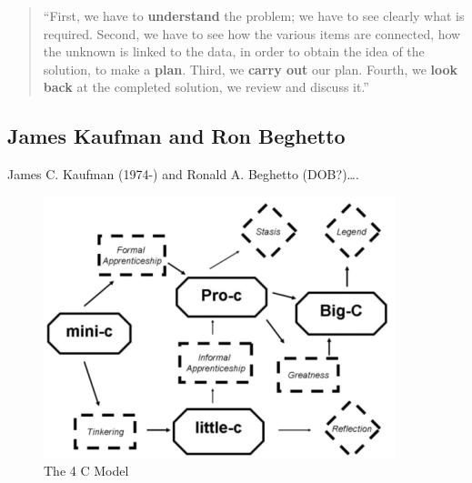 \begin{quote}
  ``First, we have to \textbf{understand} the problem; we have to see clearly what is required. Second, we have to see how the various items are connected, how the unknown is linked to the data, in order to obtain the idea of the solution, to make a \textbf{plan}. Third, we \textbf{carry out} our plan. Fourth, we \textbf{look back} at the completed solution, we review and discuss it.'' \autocite[p.5-6, his emphasis]{Polya1957}
\end{quote}


\subsection*{James Kaufman and Ron Beghetto}

James C. Kaufman (1974-) and Ronald A. Beghetto (DOB?)\ldots\autocite[See][]{Kaufman2009}.

\begin{figure}[htb] %
  \centering
  \includegraphics[width=\linewidth]{images/4C.png}
\caption[The 4 C Model]{The 4 C Model}
\label{fig:4C}
\end{figure}


